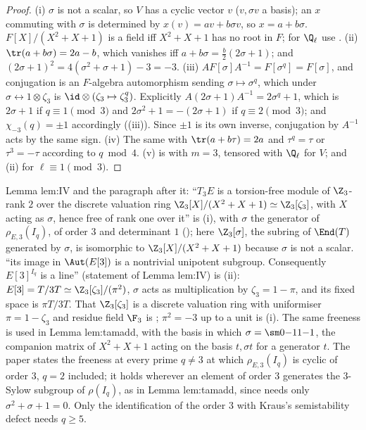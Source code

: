 \begin{proof}
(i) $\sigma$ is not a scalar, so $V$ has a cyclic vector $v$ ($v,\sigma v$ a basis); an $x$ commuting with $\sigma$ is determined by $x(v)=av+b\sigma v$, so
$x=a+b\sigma$. $F[X]/(X^2+X+1)$ is a field iff $X^2+X+1$ has no root in $F$; for $\Q_\ell$ use . (ii) $\tr(a+b\sigma)=2a-b$, which vanishes
iff $a+b\sigma=\frac b2(2\sigma+1)$; and $(2\sigma+1)^2=4(\sigma^2+\sigma+1)-3=-3$. (iii) $A F[\sigma]A^{-1}=F[\sigma^q]=F[\sigma]$, and conjugation is an
$F$-algebra automorphism sending $\sigma\mapsto\sigma^q$, which under $\sigma\leftrightarrow1\otimes\zeta_3$ is $\id\otimes(\zeta_3\mapsto\zeta_3^q)$. Explicitly
$A(2\sigma+1)A^{-1}=2\sigma^q+1$, which is $2\sigma+1$ if $q\equiv1\pmod3$ and $2\sigma^2+1=-(2\sigma+1)$ if $q\equiv2\pmod 3$; and $\chi_{-3}(q)=\pm1$
accordingly ((iii)). Since $\pm1$ is its own inverse, conjugation by $A^{-1}$ acts by the same sign. (iv) The same with $\tr(a+b\tau)=2a$ and
$\tau^q=\tau$ or $\tau^3=-\tau$ according to $q\bmod4$. (v) is  with $m=3$, tensored with $\Q_\ell$ for $V$; and
(ii) for $\ell\equiv1\pmod3$.
\end{proof}

\begin{paperlink}\label{pl:ant:IV}
Lemma lem:IV and the paragraph after it: ``$T_3E$ is a torsion-free module of $\Z_3$-rank $2$ over the discrete valuation ring
$\Z_3[X]/(X^2+X+1)\simeq\Z_3[\zeta_3]$, with $X$ acting as $\sigma$, hence free of rank one over it'' is (i), with $\sigma$ the generator of $\rho_{E,3}(I_q)$, of order $3$ and determinant $1$ (); here $\Z_3[\sigma]$, the
subring of $\End(T)$ generated by $\sigma$, is isomorphic to $\Z_3[X]/(X^2+X+1)$ because $\sigma$ is not a scalar. ``its image in $\Aut(E[3])$ is a nontrivial
unipotent subgroup. Consequently $E[3]^{I_q}$ is a line'' (statement of Lemma lem:IV) is (ii): $E[3]=T/3T\simeq\Z_3[\zeta_3]/(\pi^2)$, $\sigma$ acts as
multiplication by $\zeta_3=1-\pi$, and its fixed space is $\pi T/3T$. That $\Z_3[\zeta_3]$ is a discrete valuation ring with uniformiser $\pi=1-\zeta_3$ and
residue field $\F_3$ is ; $\pi^2=-3$ up to a unit is (i). The same freeness is used in Lemma lem:tamadd,
with the basis in which $\sigma=\sm0{-1}1{-1}$, the companion matrix of $X^2+X+1$ acting on the basis $t,\sigma t$ for a generator $t$.
The paper states the freeness at every prime $q\ne3$ at which $\rho_{E,3}(I_q)$ is cyclic of order $3$, $q=2$ included; it holds wherever an element of
order $3$ generates the $3$-Sylow subgroup of $\rho(I_q)$, as in Lemma lem:tamadd, since  needs only $\sigma^2+\sigma+1=0$. Only the
identification of the order $3$ with Kraus's semistability defect needs $q\ge5$.
\end{paperlink}

